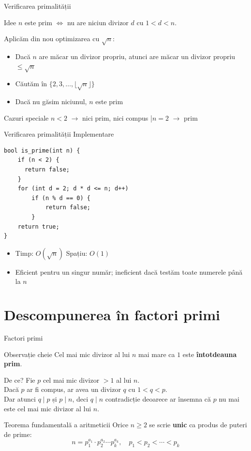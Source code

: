 \documentclass{beamer}
\begin{document}
\begin{frame}{Verificarea primalității}
  \begin{block}{Idee}
    $n$ este prim $\Leftrightarrow$ nu are niciun divizor $d$ cu $1 < d < n$.
  \end{block}
  \bigskip
  Aplicăm din nou optimizarea cu $\sqrt{n}$:
  \begin{itemize}
    \item Dacă $n$ are măcar un divizor propriu, atunci are măcar un divizor propriu $\leq \sqrt{n}$
    \item Căutăm în $\{2, 3, \ldots, \lfloor\sqrt{n}\rfloor\}$
    \item Dacă nu găsim niciunul, $n$ este prim
  \end{itemize}
  \bigskip
  \begin{block}{Cazuri speciale}
    $n < 2$ $\rightarrow$ nici prim, nici compus \quad|\quad $n = 2$ $\rightarrow$ prim
  \end{block}
\end{frame}

\begin{frame}{Verificarea primalității \textemdash{} Implementare}
  \begin{lstlisting}
bool is_prime(int n) {
    if (n < 2) {
      return false;
    }
    for (int d = 2; d * d <= n; d++)
        if (n % d == 0) {
            return false;
        }
    return true;
}
  \end{lstlisting}
  \bigskip
  \begin{itemize}
    \item Timp: $O(\sqrt{n})$ \quad Spațiu: $O(1)$
    \item Eficient pentru un singur număr; ineficient dacă testăm toate numerele până la $n$
  \end{itemize}
\end{frame}

\section{Descompunerea în factori primi}

\begin{frame}{Factori primi}
  \begin{block}{Observație cheie}
    Cel mai mic divizor al lui $n$ mai mare ca $1$ este \textbf{întotdeauna prim}.
  \end{block}
  \bigskip
  De ce? Fie $p$ cel mai mic divizor $> 1$ al lui $n$. \\
  Dacă $p$ ar fi compus, ar avea un divizor $q$ cu $1 < q < p$. \\
  Dar atunci $q \mid p$ și $p \mid n$, deci $q \mid n$ \textemdash{} contradicție deoarece ar însemna că $p$ nu mai este cel mai mic divizor al lui $n$.
  \bigskip
  \begin{block}{Teorema fundamentală a aritmeticii}
    Orice $n \geq 2$ se scrie \textbf{unic} ca produs de puteri de prime:
    \[
      n = p_1^{a_1} \cdot p_2^{a_2} \cdots p_k^{a_k}, \quad p_1 < p_2 < \cdots < p_k
    \]
  \end{block}
\end{frame}
\end{document}
